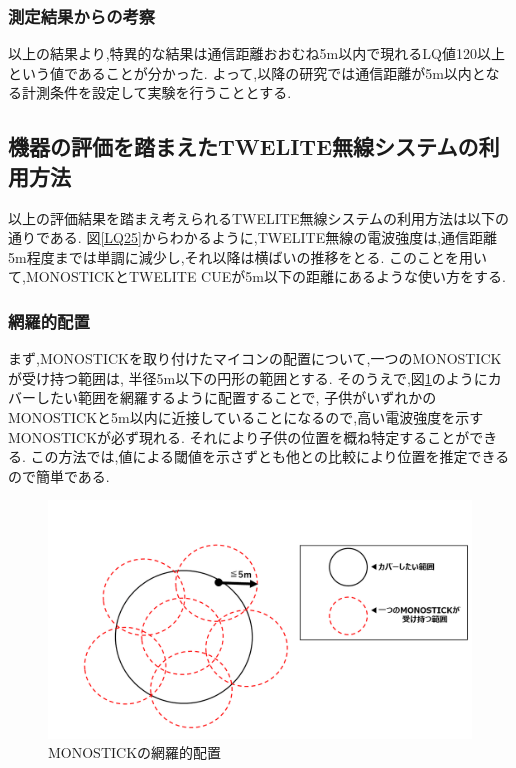 \subsubsection{測定結果からの考察}
以上の結果より,特異的な結果は通信距離おおむね5m以内で現れるLQ値120以上という値であることが分かった.
よって,以降の研究では通信距離が5m以内となる計測条件を設定して実験を行うこととする.


\subsection{機器の評価を踏まえたTWELITE無線システムの利用方法}
以上の評価結果を踏まえ考えられるTWELITE無線システムの利用方法は以下の通りである.
図\ref{LQ25}からわかるように,TWELITE無線の電波強度は,通信距離5m程度までは単調に減少し,それ以降は横ばいの推移をとる.
このことを用いて,MONOSTICKとTWELITE CUEが5m以下の距離にあるような使い方をする.

\subsubsection{網羅的配置}
まず,MONOSTICKを取り付けたマイコンの配置について,一つのMONOSTICKが受け持つ範囲は,
半径5m以下の円形の範囲とする.
そのうえで,図\ref{sysmodel}のようにカバーしたい範囲を網羅するように配置することで,
子供がいずれかのMONOSTICKと5m以内に近接していることになるので,高い電波強度を示すMONOSTICKが必ず現れる.
それにより子供の位置を概ね特定することができる.
この方法では,値による閾値を示さずとも他との比較により位置を推定できるので簡単である.
\clearpage

\begin{figure}[!tb]
  \centering
  \includegraphics[width = 16cm, bb= 0 0 1000 700]{chapter3/sysmodel.png}
  \caption{MONOSTICKの網羅的配置}
  \label{sysmodel}
\end{figure}



